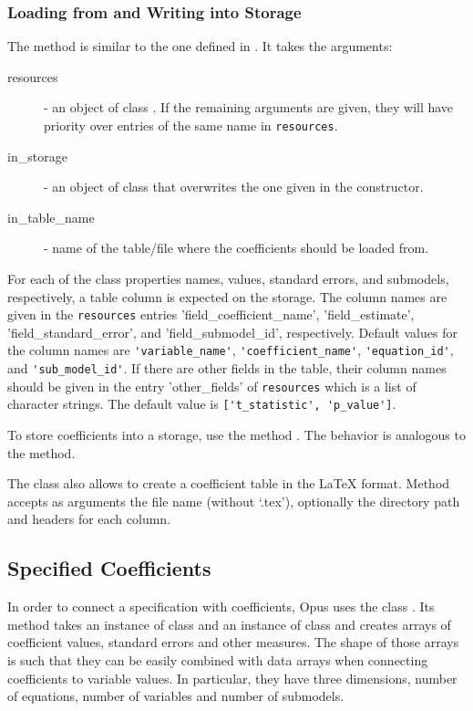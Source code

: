 \subsubsection{Loading from and Writing into Storage}
%
The method  is similar to the one defined in
. It takes the arguments:
\begin{description}
\item[resources] - an object of class . If the remaining
  arguments are given, they will have priority over entries of the same name
  in \verb|resources|.
\item[in_storage] -  an object of class  that overwrites the
  one given in the constructor.
\item[in_table_name] - name of the table/file where the coefficients should
  be loaded from.
\end{description}
For each of the class properties names, values, standard errors, and
submodels, respectively, a table column is expected on the storage. 
The column names are given in the \verb|resources|
entries 'field_coefficient_name', 'field_estimate',
'field_standard_error', and 'field_submodel_id', respectively. Default
values for the column names are \verb|'variable_name'|, \verb|'coefficient_name'|, 
\verb|'equation_id'|, and \verb|'sub_model_id'|. If there are other fields in the table, their column names should be
given in the entry 'other_fields' of  \verb|resources| which is a list of character strings. The
default value is \verb|['t_statistic', 'p_value']|.

To store coefficients into a storage, use the method
. The behavior is
analogous to the  method.

The class also allows to create a coefficient table in the \LaTeX
format. Method  accepts as arguments the file name
(without `.tex'), optionally the directory path and headers for each column.

\subsection{Specified Coefficients}
\label{sec:specified-coefficients}
%
In order to connect a specification with coefficients, Opus uses the class
. Its method  takes an instance
of class  and an instance of class
 and creates arrays of coefficient values,
standard errors and other measures. The shape of those arrays is such that
they can be easily combined with data arrays when connecting coefficients to
variable values. In particular, they have three dimensions, number of
equations, number of variables and number of submodels.

